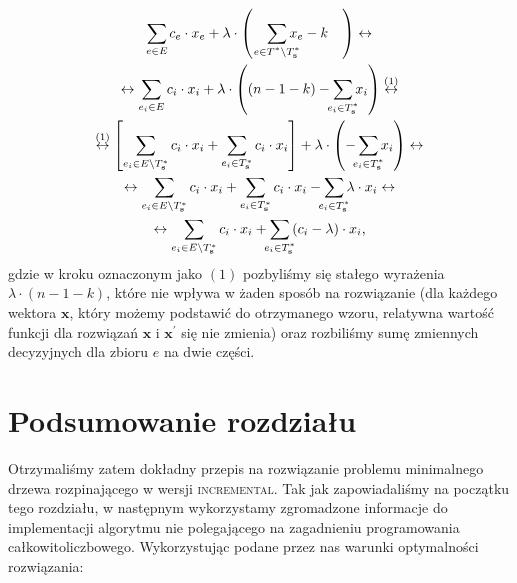 \begin{gather}\label{eq:imstcosts}
	\sum_{\mathclap{e \in E}} c_{e} \cdot x_{e} + \lambda \cdot \left( \quad \sum_{\mathclap{e \in T^{\ast} \setminus T^{\ast}_{\textbf{s}}}} x_{e} - k \quad \right) \leftrightarrow \\
	\leftrightarrow \sum_{e_{i} \in E} c_{i} \cdot x_{i} + \lambda \cdot \left( \left( n - 1 - k \right) - \sum_{\mathclap{e_{i} \in T^{\ast}_{\textbf{s}}}} x_{i} \right) \overset{\left( 1 \right)}{\leftrightarrow}\\
	\overset{\left( 1 \right)}{\leftrightarrow} \left[ \sum_{e_{i} \in E \setminus T^{\ast}_{\textbf{s}}} c_{i} \cdot x_{i} + \sum_{e_{i} \in T^{\ast}_{\textbf{s}}} c_{i} \cdot x_{i} \right] + \lambda \cdot \left( - \sum_{\mathclap{e_{i} \in T^{\ast}_{\textbf{s}}}} x_{i} \right) \leftrightarrow \\
	\leftrightarrow \sum_{e_{i} \in E \setminus T^{\ast}_{\textbf{s}}} c_{i} \cdot x_{i} + \sum_{e_{i} \in T^{\ast}_{\textbf{s}}} c_{i} \cdot x_{i} - \sum_{\mathclap{e_{i} \in T^{\ast}_{\textbf{s}}}} \lambda \cdot x_{i} \leftrightarrow \\
	\leftrightarrow \sum_{e_{i} \in E \setminus T^{\ast}_{\textbf{s}}} c_{i} \cdot x_{i} + \sum_{\mathclap{e_{i} \in T^{\ast}_{\textbf{s}}}} \left( c_{i} - \lambda \right) \cdot x_{i}\label{eq:imstcosts:e}\text{,}
\end{gather}
gdzie w kroku oznaczonym jako $\left( 1 \right)$ pozbyliśmy się stałego wyrażenia $\lambda \cdot \left( n - 1 - k \right)$, które nie wpływa w żaden sposób na rozwiązanie (dla każdego wektora $\textbf{x}$, który możemy podstawić do otrzymanego wzoru, relatywna wartość funkcji dla rozwiązań $\textbf{x}$ i $\textbf{x}^{\prime}$ się nie zmienia) oraz rozbiliśmy sumę zmiennych decyzyjnych dla zbioru $e$ na dwie części.

\section{Podsumowanie rozdziału}

Otrzymaliśmy zatem dokładny przepis na rozwiązanie problemu minimalnego drzewa rozpinającego w wersji \textsc{incremental}. Tak jak zapowiadaliśmy na początku tego rozdziału, w następnym wykorzystamy zgromadzone informacje do implementacji algorytmu nie polegającego na zagadnieniu programowania całkowitoliczbowego. Wykorzystując podane przez nas warunki optymalności rozwiązania:

